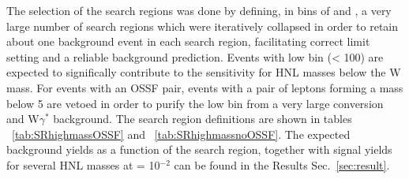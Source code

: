 The selection of the search regions was done by defining, in bins of
\mtmin and \mmin, a very large number of search regions which were
iteratively collapsed in order to retain about one background event in
each search region, facilitating correct limit setting and a reliable
background prediction. Events with low
\mlll bin (\mlll < 100\GeV) are expected to significally contribute to
the sensitivity for HNL masses below the W mass. For events with an
OSSF pair, events with a pair of \lo leptons forming a mass below 5
\GeV are vetoed in order to purify the low \mlll bin from a very large
conversion and W$\gamma^{*}$ background. The search region definitions
are shown in tables ~\ref{tab:SRhighmassOSSF} and
~\ref{tab:SRhighmassnoOSSF}. The expected background yields as a
function of the search region, together with signal yields for several
HNL masses at \mixpar = 10$^{-2}$ can be found in the Results
Sec.~\ref{sec:result}.



\begin{table}[h!]
\centering
{\small
\caption{Search regions for events with an OSSF pair in the high mass category.}
\label{tab:SRhighmassOSSF}
}
\end{table}

